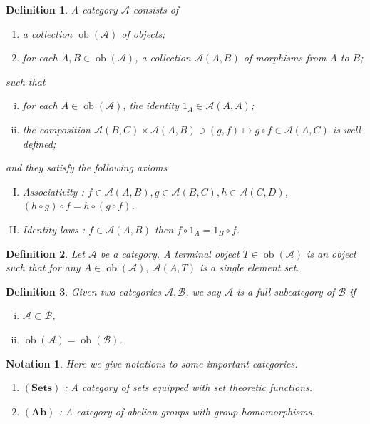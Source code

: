 \documentclass{article}
\newtheorem{definition}{Definition}[section]
\newtheorem{notation}{Notation}[section]
\numberwithin{equation}{section}
\DeclareMathOperator{\ob}{ob}
\begin{document}
\begin{definition}
A category $\mathcal{A}$ consists of
\begin{enumerate}[\textbullet]
\item a collection $\ob(\mathcal{A})$ of objects;
\item for each $A,B\in\ob(\mathcal{A})$, a collection $\mathcal{A}(A,B)$ of morphisms from $A$ to $B$;
\end{enumerate}
such that 
\begin{enumerate}[i).]
\item for each $A\in\ob(\mathcal{A})$, the identity $1_A\in\mathcal{A}(A,A)$;
\item the composition $\mathcal{A}(B,C)\times\mathcal{A}(A,B)\ni(g,f)\mapsto g\circ f\in\mathcal{A}(A,C)$ is well-defined;
\end{enumerate}
and they satisfy the following axioms
\begin{enumerate}[I).]
\item Associativity : $f\in\mathcal{A}(A,B),g\in\mathcal{A}(B,C),h\in\mathcal{A}(C,D)$, $(h\circ g)\circ f = h\circ (g\circ f)$.
\item Identity laws : $f\in\mathcal{A}(A,B)$ then $f\circ 1_A = 1_B\circ f$.
\end{enumerate}
\end{definition}

\begin{definition}
Let $\mathcal{A}$ be a category. A terminal object $T\in\ob(\mathcal{A})$ is an object such that for any $A\in\ob(\mathcal{A})$, $\mathcal{A}(A,T)$ is a single element set.
\end{definition}

\begin{definition}
Given two categories $\mathcal{A},\mathcal{B}$, we say $\mathcal{A}$ is a full-subcategory of $\mathcal{B}$ if 
\begin{enumerate}[i).]
\item $\mathcal{A}\subset\mathcal{B}$,
\item $\ob(\mathcal{A})=\ob(\mathcal{B})$.
\end{enumerate}
\end{definition}

\begin{notation}
Here we give notations to some important categories.
\begin{enumerate}[\textbullet]
\item $(\mathbf{Sets})$ : A category of sets equipped with set theoretic functions.
\item $(\mathbf{Ab})$ : A category of abelian groups with group homomorphisms.
\end{enumerate}
\end{notation}
\end{document}

